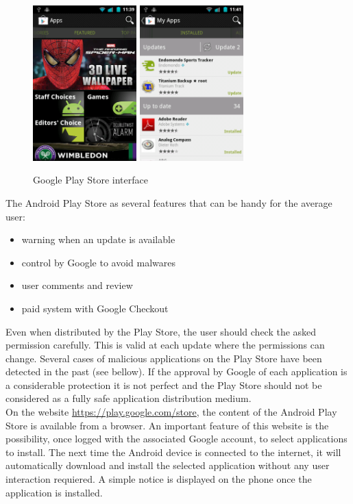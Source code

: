 \begin{figure}[h]
  \centering
  \includegraphics[width=4cm]{images/market1.png}
  \includegraphics[width=4cm]{images/market2.png}
  \caption{Google Play Store interface}
  \label{fig:market}
\end{figure}

The Android Play Store as several features that can be handy for the average user:
\begin{itemize}
\item warning when an update is available
\item control by Google to avoid malwares
\item user comments and review
\item paid system with Google Checkout
\end{itemize}

Even when distributed by the Play Store, the user should check the asked permission carefully.
This is valid at each update where the permissions can change.
Several cases of malicious applications on the Play Store have been detected in the past (see bellow).
If the approval by Google of each application is a considerable protection it is not perfect and the Play Store should not be considered as a fully safe application distribution medium.\\

On the website \url{https://play.google.com/store}, the content of the Android Play Store is available from a browser.
An important feature of this website is the possibility, once logged with the associated Google account, to select applications to install.
The next time the Android device is connected to the internet, it will automatically download and install the selected application without any user interaction requiered.
A simple notice is displayed on the phone once the application is installed.\\


